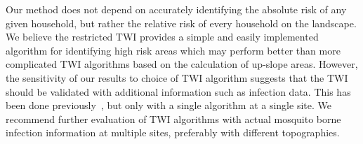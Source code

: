 \documentclass[10pt,letterpaper]{article}\usepackage[]{graphicx}\usepackage[]{color}
\begin{document}
Our method does not depend on accurately identifying the absolute risk of any given household, but rather the relative risk of every household on the landscape.  We believe the restricted TWI provides a simple and easily implemented algorithm for identifying high risk areas which may perform better than more complicated TWI algorithms based on the calculation of up-slope areas.  However, the sensitivity of our results to choice of TWI algorithm suggests that the TWI should be validated with additional information such as infection data.  This has been done previously~\cite{Cohen2008, Cohen2010},  but only with a single algorithm at a single site.  We recommend further evaluation of TWI algorithms with actual mosquito borne infection information at multiple sites, preferably with different topographies.\\


\nolinenumbers
\end{document}
